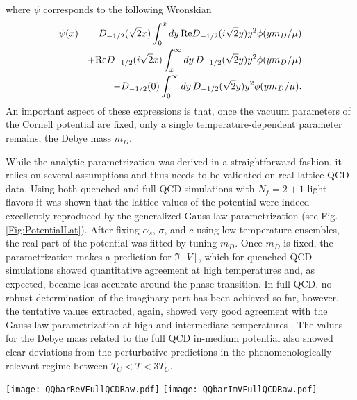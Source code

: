 where $\psi$ corresponds to the following Wronskian
\begin{eqnarray} 
 \notag\psi(x)&=&D_{-1/2}(\sqrt{2}x)\int_0^x dy\, {\rm Re}D_{-1/2}(i\sqrt{2}y)y^2 \phi(ym_D/\mu)\\\notag&&\hspace{-4mm}+{\rm Re}D_{-1/2}(i\sqrt{2}x)\int_x^\infty dy\, D_{-1/2}(\sqrt{2}y)y^2 \phi(ym_D/\mu)\\ \nonumber&&-D_{-1/2}(0)\int_0^\infty dy\, D_{-1/2}(\sqrt{2}y)y^2 \phi(ym_D/\mu).
\end{eqnarray}
An important aspect of these expressions is that, once the vacuum parameters of the Cornell potential are fixed, only a single temperature-dependent parameter remains, the Debye mass $m_D$.

While the analytic parametrization was derived in a straightforward fashion, it relies on several assumptions and thus needs to be validated on real lattice QCD data. Using both quenched \cite{Burnier:2016mxc} and full QCD simulations with $N_f=2+1$ light flavors \cite{Burnier:2015tda} it was shown that the lattice values of the potential were indeed excellently reproduced by the generalized Gauss law parametrization (see Fig.\ref{Fig:PotentialLat}). After fixing $\alpha_s$, $\sigma$, and $c$ using low temperature ensembles, the real-part of the potential was fitted by tuning $m_D$. Once $m_D$ is fixed, the parametrization makes a prediction for $\Im[V]$, which for quenched QCD simulations showed quantitative agreement at high temperatures and, as expected, became less accurate around the phase transition. In full QCD, no robust determination of the imaginary part has been achieved so far, however, the tentative values extracted, again, showed very good agreement with the Gauss-law parametrization at high and intermediate temperatures \cite{Burnier:2015tda}. The values for the Debye mass related to the full QCD in-medium potential also showed clear deviations from the perturbative predictions in the phenomenologically relevant regime between $T_C<T<3T_C$.

\begin{figure*}
\texttt{[image: QQbarReVFullQCDRaw.pdf]}
\texttt{[image: QQbarImVFullQCDRaw.pdf]}
\caption{The real (left) and imaginary (right) part of the in-medium heavy quark potential in full QCD with $N_f=2+1$ light quark flavors based on ensembles by the HotQCD collaboration (colored points, shifted for better readability). The vacuum parameters here are tuned using the $T\approx0$ ensembles at $\beta=6.9$ and $\beta=7.48$. By adjusting the Debye mass parameter $m_D$, the lattice QCD values of $\Re[V]$ are reproduced very well via the Gauss-law parametrization (solid lines) over all separation distances and temperatures. The theoretical error bars (shown as shaded regions surrounding the central line) arise from the fit uncertainty of $m_D$. For $\Im[V]$, the agreement at high temperatures and small distances is very good, while at $T\approx T_C$ deviations from the extracted lattice values are visible. (The crossover temperature on these lattices due to the relatively large pion mass of $m_\pi\approx300$MeV lies at $T_C=172.5$ MeV) }\label{Fig:PotentialLat}
\end{figure*}

